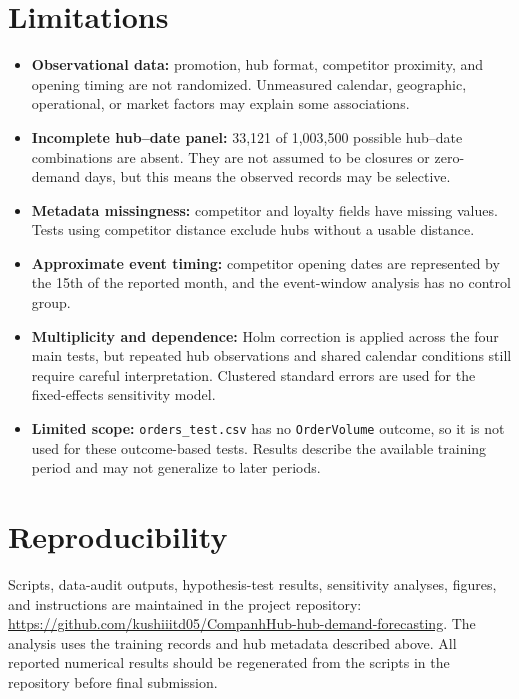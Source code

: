 \documentclass[10pt,a4paper,twocolumn]{article}
\begin{document}
\section{Limitations}
\begin{itemize}
\item \textbf{Observational data:} promotion, hub format, competitor proximity, and opening timing are not randomized. Unmeasured calendar, geographic, operational, or market factors may explain some associations.
\item \textbf{Incomplete hub--date panel:} 33,121 of 1,003,500 possible hub--date combinations are absent. They are not assumed to be closures or zero-demand days, but this means the observed records may be selective.
\item \textbf{Metadata missingness:} competitor and loyalty fields have missing values. Tests using competitor distance exclude hubs without a usable distance.
\item \textbf{Approximate event timing:} competitor opening dates are represented by the 15th of the reported month, and the event-window analysis has no control group.
\item \textbf{Multiplicity and dependence:} Holm correction is applied across the four main tests, but repeated hub observations and shared calendar conditions still require careful interpretation. Clustered standard errors are used for the fixed-effects sensitivity model.
\item \textbf{Limited scope:} \texttt{orders\_test.csv} has no \texttt{OrderVolume} outcome, so it is not used for these outcome-based tests. Results describe the available training period and may not generalize to later periods.
\end{itemize}

\section*{Reproducibility}
Scripts, data-audit outputs, hypothesis-test results, sensitivity analyses, figures, and instructions are maintained in the project repository:
\url{https://github.com/kushiiitd05/CompanhHub-hub-demand-forecasting}.
The analysis uses the training records and hub metadata described above. All reported numerical results should be regenerated from the scripts in the repository before final submission.
\end{document}
